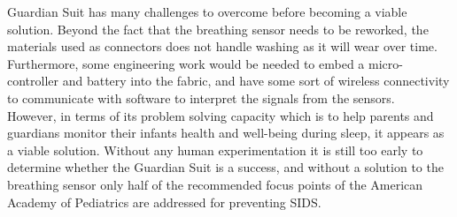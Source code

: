 \documentclass{sigchi-ext}
\begin{document}
Guardian Suit has many challenges to overcome before becoming a viable solution. Beyond the fact that the breathing sensor needs
to be reworked, the materials used as connectors does not handle washing as it will wear over time. Furthermore, some engineering
work would be needed to embed a micro-controller and battery into the fabric, and have some sort of wireless connectivity to communicate with software to interpret the signals from the sensors. \\
However, in terms of its problem solving capacity which is to help parents and guardians monitor their infants health and well-being
during sleep, it appears as a viable solution. Without any human experimentation it is still too early to determine whether the Guardian Suit is a 
success, and without a solution to the breathing sensor only half of the recommended focus points of the American Academy of Pediatrics
are addressed for preventing SIDS.

\balance{}



\end{document}
